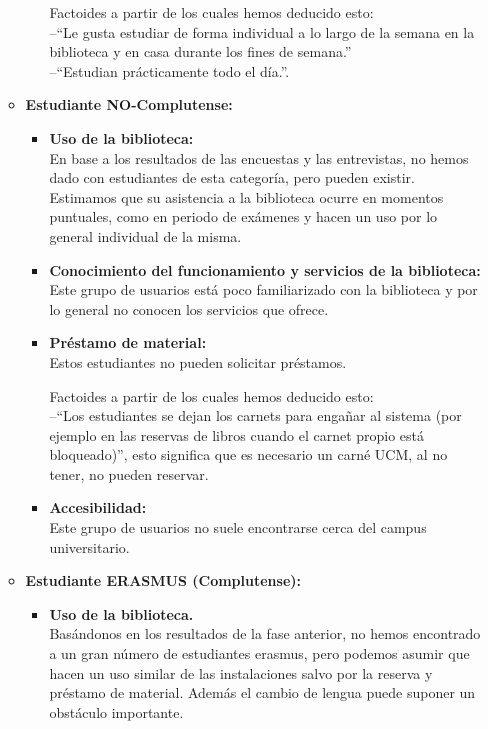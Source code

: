 \documentclass[12pt]{article}
\begin{document}
\begin{itemize}
\begin{itemize}
\begin{itemize}
			Factoides a partir de los cuales hemos deducido esto: \\--``Le gusta estudiar de forma individual a lo largo de la semana en la biblioteca y en casa durante los fines de semana.'' \\ --``Estudian prácticamente todo el día.''.

	\end{itemize}
	\item \textbf{Estudiante NO-Complutense:}
	\begin{itemize}
		\item \textbf{Uso de la biblioteca: \\}
			En base a los resultados de las encuestas y las entrevistas, no hemos dado con estudiantes de esta categoría, pero pueden existir. Estimamos que su asistencia a la biblioteca ocurre en momentos puntuales, como en periodo de exámenes y hacen un uso por lo general individual de la misma.

		\item \textbf{Conocimiento del funcionamiento y servicios de la biblioteca: \\}
			Este grupo de usuarios está poco familiarizado con la biblioteca y por lo general no conocen los servicios que ofrece.

		\item \textbf{Préstamo de material: \\}
			Estos estudiantes no pueden solicitar préstamos.

			Factoides a partir de los cuales hemos deducido esto: \\
			--``Los estudiantes se dejan los carnets para engañar al sistema (por ejemplo en las reservas de libros cuando el carnet propio está bloqueado)'', esto significa que es necesario un carné UCM, al no tener, no pueden reservar.

		\item \textbf{Accesibilidad: \\}
			Este grupo de usuarios no suele encontrarse cerca del campus universitario.

	\end{itemize}
	\item \textbf{Estudiante ERASMUS (Complutense): }
	\begin{itemize}
		\item \textbf{Uso de la biblioteca. \\}
			Basándonos en los resultados de la fase anterior, no hemos encontrado a un gran número de estudiantes erasmus, pero podemos asumir que hacen un uso similar de las instalaciones salvo por la reserva y préstamo de material. Además el cambio de lengua puede suponer un obstáculo importante.


\end{itemize}
\end{itemize}
\end{itemize}
\end{document}
